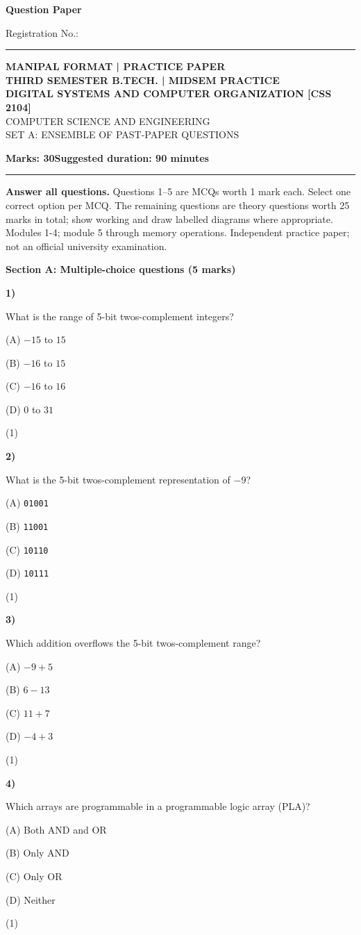 \documentclass[11pt,a4paper]{article}
\newcommand{\question}[3]{\par\vspace{8pt}\noindent\begin{minipage}[t]{0.075\linewidth}\textbf{#1)}\end{minipage}\begin{minipage}[t]{0.855\linewidth}#3\end{minipage}\hfill\begin{minipage}[t]{0.055\linewidth}\raggedleft(#2)\end{minipage}\par}
\begin{document}
{\LARGE\bfseries Question Paper}\hfill {\small Registration No.: \rule{33mm}{0.3pt}}\par\vspace{8pt}
\begin{center}{\large\bfseries MANIPAL FORMAT | PRACTICE PAPER}\\[6pt]{\bfseries THIRD SEMESTER B.TECH. | MIDSEM PRACTICE}\\[4pt]{\bfseries DIGITAL SYSTEMS AND COMPUTER ORGANIZATION [CSS 2104]}\\[4pt]{\small COMPUTER SCIENCE AND ENGINEERING}\\[3pt]{\small SET A: ENSEMBLE OF PAST-PAPER QUESTIONS}\end{center}
\textbf{Marks: 30}\hfill\textbf{Suggested duration: 90 minutes}\par\vspace{3pt}\hrule\vspace{5pt}
{\small\textbf{Answer all questions.} Questions 1--5 are MCQs worth 1 mark each. Select one correct option per MCQ. The remaining questions are theory questions worth 25 marks in total; show working and draw labelled diagrams where appropriate. Modules 1-4; module 5 through memory operations. Independent practice paper; not an official university examination.}\par
\medskip\textbf{Section A: Multiple-choice questions (5 marks)}\par
\question{1}{1}{What is the range of 5-bit two\textquotesingle s-complement integers?\par (A) $-15$ to $15$\par (B) $-16$ to $15$\par (C) $-16$ to $16$\par (D) $0$ to $31$}
\question{2}{1}{What is the 5-bit two\textquotesingle s-complement representation of $-9$?\par (A) \texttt{01001}\par (B) \texttt{11001}\par (C) \texttt{10110}\par (D) \texttt{10111}}
\question{3}{1}{Which addition overflows the 5-bit two\textquotesingle s-complement range?\par (A) $-9+5$\par (B) $6-13$\par (C) $11+7$\par (D) $-4+3$}
\question{4}{1}{Which arrays are programmable in a programmable logic array (PLA)?\par (A) Both AND and OR\par (B) Only AND\par (C) Only OR\par (D) Neither}
\end{document}
